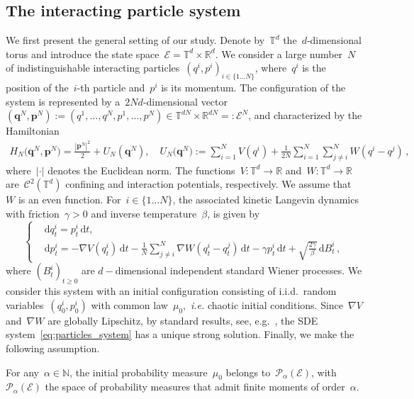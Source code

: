 \documentclass[onefignum,onetabnum]{siamart251216} %
\renewcommand{\d}{\mathrm{d}}
\newcommand{\torus}{\mathbb T}
\newcommand{\real}{\mathbb R}
\newcommand{\mc}[1]{\mathcal{#1}}
\renewcommand{\geq}{\geqslant}
\newcommand{\mescin}{\mu}
\newcommand{\vq}[1]{q^{#1}}
\newcommand{\vp}[1]{p^{#1}}
\newcommand{\vqt}[1]{q_t^{#1}}
\newcommand{\vpt}[1]{p_t^{#1}}
\newcommand{\vqz}[1]{q_0^{#1}}
\newcommand{\vpz}[1]{p_0^{#1}}
\newcommand{\vP}[1]{\mathbf{p}^{#1}}
\newcommand{\vQ}[1]{\mathbf{q}^{#1}}
\newcounter{assumptioncounter}
\newenvironment{assumption}[1][]{%
  \refstepcounter{assumptioncounter}%
  \trivlist
  \item[\hskip\labelsep\hskip\parindent\scshape Assumption~\theassumptioncounter.]%
  \normalfont\ignorespaces
}{\endtrivlist}
\theoremstyle{plain}
\newtheorem{assumption}[theorem]{Assumption}
\numberwithin{equation}{section}
\numberwithin{theorem}{section}
\begin{document}
\subsection{The interacting particle system}
\label{sec:particles_system}
We first present the general setting of our study.
Denote by~$\torus^d$ the~$d$-dimensional torus and introduce the state space~$\mc{E} = \torus^d \times \real^d$.
We consider a large number~$N$ of indistinguishable interacting particles~$(\vq{i},\vp{i})_{i\in\{1\dots N\}}$,
where~$\vq{i}$ is the position of the~$i$-th particle and~$\vp{i}$ is its momentum.
The configuration of the system is represented by a~$2Nd$-dimensional vector~$(\vQ{N},\vP{N}):=\left(\vq{1},\dots,\vq{N},\vp{1},\dots,\vp{N}\right)\in \torus^{dN} \times \real^{dN} =: \mc{E}^N$,
and characterized by the Hamiltonian
\begin{align}
\label{eq:potential_U}
    H_N\bigl(\vQ{N},\vP{N}\bigr)
    =\frac{|\vP{N}|^2}{2} + U_N(\vQ{N}),
    \quad
    U_N\bigl(\vQ{N}\bigr)
    := \sum_{i=1}^{N}V(\vq{i}) +\frac{1}{2N} \sum_{i=1}^{N}\sum_{j\neq i}^{N}W(\vq{i} - \vq{j}) \, ,
\end{align}
where~$|\cdot |$ denotes the Euclidean norm. The functions~$V\colon \torus^d \rightarrow \real$ and~$W\colon \torus^d \rightarrow \real$ are~$\mc{C}^2(\torus^d)$ confining and interaction potentials, respectively. We assume that~$W$ is an even function.
For~$i\in\{1\dots N\}$, the associated kinetic Langevin dynamics with friction~$\gamma >0$ and inverse temperature~$\beta$, is given by
\begin{equation}
    \label{eq:particles_system}
    \left\{\begin{aligned}
    &\d \vqt{i} =  \vpt{i}\, \d t, \\
    &\d \vpt{i} = -\nabla V(\vqt{i})\,\d t -\frac1N \sum_{j\neq i}^{N}\nabla W(\vqt{i} -\vqt{j}) \,\d t - \gamma \vpt{i} \,\d t + \sqrt{\frac{2 \gamma}{\beta}}\,\d B_t^i \, ,
    \end{aligned}\right.
\end{equation}
where $(B^i_t)_{t \geq 0}$
are $d-$dimensional independent standard Wiener processes.
We consider this system with an initial configuration consisting of i.i.d.\ random variables~$(\vqz{i},\vpz{i})$ with common law~$\mescin_0$,~\textit{i.e.} chaotic initial conditions. Since~$\nabla V$ and~$\nabla W$ are globally Lipschitz, by standard results, see, e.g.~\cite[Theorem 3.1.1]{Rockner2007},
the SDE system~\eqref{eq:particles_system} has a unique strong solution.
Finally, we make the following assumption.
\begin{assumption}
    \label{assumption:moments_p}
    For any~$\alpha \in \mathbb{N}$, the initial probability measure~$\mescin_0$ belongs to~$\mc{P}_\alpha(\mc{E})$, with~$\mc{P}_\alpha(\mc{E})$ the space of probability measures that admit finite moments of order~$\alpha$.
\end{assumption}
\end{document}

